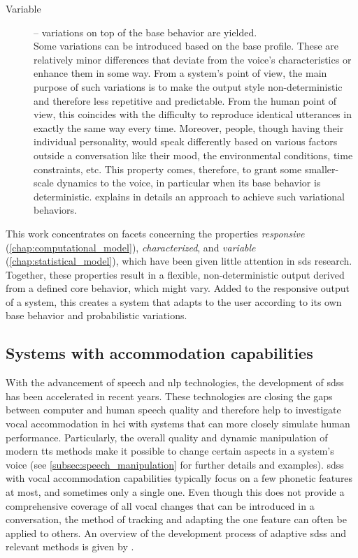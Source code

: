 \begin{description}
	\item[Variable] -- variations on top of the base behavior are yielded.\\
	Some variations can be introduced based on the base profile.
	These are relatively minor differences that deviate from the voice's characteristics or enhance them in some way.
	From a system's point of view, the main purpose of such variations is to make the output style non-deterministic and therefore less repetitive and predictable.
	From the human point of view, this coincides with the difficulty to reproduce identical utterances in exactly the same way every time.
	Moreover, people, though having their individual personality, would speak differently based on various factors outside a conversation like their mood, the environmental conditions, time constraints, etc.
	This property comes, therefore, to grant some smaller-scale dynamics to the voice, in particular when its base behavior is deterministic.
	 explains in details an approach to achieve such variational behaviors.
\end{description}
%

This work concentrates on facets concerning the properties \emph{responsive} (\cref{chap:computational_model}), \emph{characterized}, and \emph{variable} (\cref{chap:statistical_model}), which have been given little attention in \ac{sds} research.
Together, these properties result in a flexible, non-deterministic output derived from a defined core behavior, which might vary.
Added to the responsive output of a system, this creates a system that adapts to the user according to its own base behavior and probabilistic variations.

\subsection{Systems with accommodation capabilities}
\label{subsec:systems_with_accommodation_capabilities}

With the advancement of speech and \ac{nlp} technologies, the development of \acp{sds} has been accelerated in recent years.
These technologies are closing the gaps between computer and human speech quality and therefore help to investigate vocal accommodation in \ac{hci} with systems that can more closely simulate human performance.
Particularly, the overall quality and dynamic manipulation of modern \ac{tts} methods make it possible to change certain aspects in a system's voice (see \cref{subsec:speech_manipulation} for further details and examples).
\Acp{sds} with vocal accommodation capabilities typically focus on a few phonetic features at most, and sometimes only a single one.
Even though this does not provide a comprehensive coverage of all vocal changes that can be introduced in a conversation, the method of tracking and adapting the one feature can often be applied to others.
An overview of the development process of adaptive \acp{sds} and relevant methods is given by \citet{Levitan2020developing, Bernsen1998designing}.

